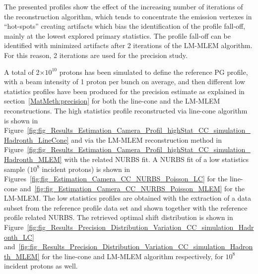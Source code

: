 The presented profiles show the effect of the increasing number of iterations of the reconstruction algorithm, which tends to concentrate the emission vertexes in \enquote{hot-spots} creating artifacts which bias the identification of the profile fall-off, mainly at the lowest explored primary statistics. The profile fall-off can be identified with minimized artifacts after 2 iterations of the LM-MLEM algorithm. For this reason, 2 iterations are used for the precision study.

A total of 2$\times10^{10}$ protons has been simulated to define the reference PG profile, with a beam intensity of 1 proton per bunch on average, and then different low statistics profiles have been produced for the precision estimate as explained in section~\ref{MatMeth:precision} for both the line-cone and the LM-MLEM reconstructions. 
The high statistics profile reconstructed via line-cone algorithm is shown in Figure~\ref{fig:fig_Results_Estimation_Camera_Profil_highStat_CC_simulation_Hadronth_LineCone} and via the LM-MLEM reconstruction method in Figure~\ref{fig:fig_Results_Estimation_Camera_Profil_highStat_CC_simulation_Hadronth_MLEM} with the related NURBS fit. A NURBS fit of a low statistics sample ($10^8$ incident protons) is shown in Figures~\ref{fig:fig_Estimation_Camera_CC_NURBS_Poisson_LC} for the line-cone and~\ref{fig:fig_Estimation_Camera_CC_NURBS_Poisson_MLEM} for the LM-MLEM. The low statistics profiles are obtained with the extraction of a data subset from the reference profile data set and shown together with the reference profile related NURBS.
The retrieved optimal shift distribution is shown in Figure~\ref{fig:fig_Results_Precision_Distribution_Variation_CC_simulation_Hadronth_LC} and~\ref{fig:fig_Results_Precision_Distribution_Variation_CC_simulation_Hadronth_MLEM} for the line-cone and LM-MLEM algorithm respectively, for $10^8$ incident protons as well.

